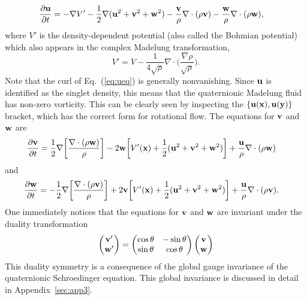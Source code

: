 \documentclass[a4paper,aps,prd,preprint,groupedaddress]{revtex4}
\newcommand{\bfu}{{\bf u}}
\newcommand{\bfv}{{\bf v}}
\newcommand{\bfw}{{\bf w}}
\begin{document}
\begin{equation}
\label{eq:ueq}
\begin{split}
\frac{\partial \bfu}{\partial t}&=-\nabla V'-\frac{1}{2}\nabla(\bfu^2 +\bfv^2 +\bfw^2)
-\frac{\bfv}{\rho}\nabla\cdot(\rho\bfv)-\frac{\bfw}{\rho}\nabla\cdot(\rho\bfw),
\end{split}
\end{equation}
where $V'$ is the density-dependent potential (also called the Bohmian potential) which also appears in the complex Madelung transformation,
\begin{equation}
V' = V-\frac{1}{4\sqrt{\rho}}\nabla\cdot\biggl(\frac{\nabla\rho}{\sqrt{\rho}}\biggr).
\end{equation} 
Note that the curl of Eq.~(\ref{eq:ueq}) is generally nonvanishing.  Since $\bfu$ is identified as the singlet density, this means that the quaternionic Madelung fluid has non-zero vorticity. This can be clearly seen by inspecting the $\{\bfu({\bf x}),\bfu({\bf y})\}$ bracket, which has the correct form for rotational flow. The equations for $\bfv$ and $\bfw$ are
\begin{equation}
\label{eq:veq}
\begin{split}
\frac{\partial\bfv}{\partial t}&=\frac{1}{2}\nabla\biggl[\frac{\nabla\cdot(\rho\bfw)}{\rho}\biggr] - 2\bfw\biggl[V'({\bf x})+\frac{1}{2}(\bfu^2 +\bfv^2 +\bfw^2)\biggr]+\frac\bfu{\rho}\nabla\cdot(\rho\bfw)
\end{split}
\end{equation}
and
\begin{equation}
\label{eq:weq}
\begin{split}
\frac{\partial\bfw}{\partial t}&=-\frac{1}{2}\nabla\biggl[\frac{\nabla\cdot(\rho\bfv)}{\rho}\biggr] + 2\bfv\biggl[V'({\bf x})+\frac{1}{2}(\bfu^2 +\bfv^2 +\bfw^2)\biggr]+\frac\bfu{\rho}\nabla\cdot(\rho\bfv).
\end{split}
\end{equation}
One immediately notices that the equations for $\bfv$ and $\bfw$ are invariant under the duality transformation
\begin{equation}
\label{eq:duality}
\begin{pmatrix}
\bfv'\\
\bfw'\\
\end{pmatrix}
= \begin{pmatrix}
\cos\theta & -\sin\theta\\
\sin\theta & \cos\theta\\
\end{pmatrix}
\begin{pmatrix}
\bfv\\
\bfw\\
\end{pmatrix}
\end{equation}
This duality symmetry is a consequence of the global gauge invariance of the quaternionic Schroedinger equation. This global invariance is discussed in detail in Appendix~\ref{sec:app3}.
\end{document}
